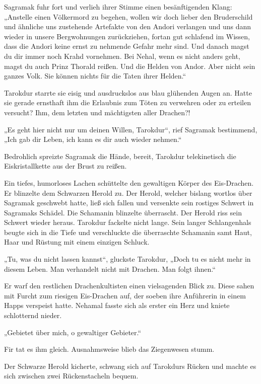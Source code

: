 Sagramak fuhr fort und verlieh ihrer Stimme einen besänftigenden Klang: „Anstelle einen Völkermord zu begehen, wollen wir doch lieber den Bruderschild und ähnliche uns zustehende Artefakte von den Andori verlangen und uns dann wieder in unsere Bergwohnungen zurückziehen, fortan gut schlafend im Wissen, dass die Andori keine ernst zu nehmende Gefahr mehr sind. Und danach magst du dir immer noch Krahd vornehmen. Bei Nehal, wenn es nicht anders geht, magst du auch Prinz Thorald reißen. Und die Helden von Andor. Aber nicht sein ganzes Volk. Sie können nichts für die Taten ihrer Helden.“

Tarokdur starrte sie eisig und ausdruckslos aus blau glühenden Augen an. Hatte sie gerade ernsthaft ihm die Erlaubnis zum Töten zu verwehren oder zu erteilen versucht? Ihm, dem letzten und mächtigsten aller Drachen?!

„Es geht hier nicht nur um deinen Willen, Tarokdur“, rief Sagramak bestimmend, „Ich gab dir Leben, ich kann es dir auch wieder nehmen.“

Bedrohlich spreizte Sagramak die Hände, bereit, Tarokdur telekinetisch die Eiskristallkette aus der Brust zu reißen.

Ein tiefes, humorloses Lachen schüttelte den gewaltigen Körper des Eis-Drachen. Er blinzelte dem Schwarzen Herold zu. Der Herold, welcher bislang wortlos über Sagramak geschwebt hatte, ließ sich fallen und versenkte sein rostiges Schwert in Sagramaks Schädel. Die Schamanin blinzelte überrascht. Der Herold riss sein Schwert wieder heraus. Tarokdur fackelte nicht lange. Sein langer Schlangenhals beugte sich in die Tiefe und verschluckte die überraschte Schamanin samt Haut, Haar und Rüstung mit einem einzigen Schluck.

„Tu, was du nicht lassen kannst“, gluckste Tarokdur, „Doch tu es nicht mehr in diesem Leben. Man verhandelt nicht mit Drachen. Man folgt ihnen.“

Er warf den restlichen Drachenkultisten einen vielsagenden Blick zu. Diese sahen mit Furcht zum riesigen Eis-Drachen auf, der soeben ihre Anführerin in einem Happs verspeist hatte. Nehamal fasste sich als erster ein Herz und kniete schlotternd nieder.

„Gebietet über mich, o gewaltiger Gebieter.“

Fir tat es ihm gleich. Ausnahmsweise blieb das Ziegenwesen stumm.

Der Schwarze Herold kicherte, schwang sich auf Tarokdurs Rücken und machte es sich zwischen zwei Rückenstacheln bequem.


